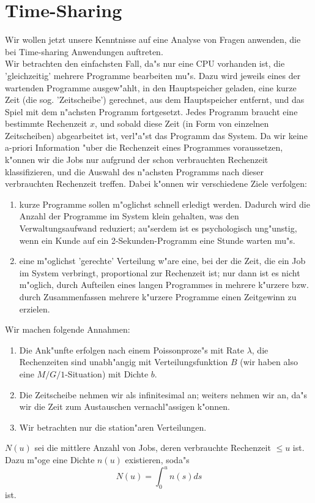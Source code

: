 \chapter{Time-Sharing}
Wir wollen jetzt unsere Kenntnisse auf eine Analyse von Fragen anwenden, die bei Time-sharing Anwendungen auftreten. \\
Wir betrachten den einfachsten Fall, da"s nur eine CPU vorhanden ist, die 'gleichzeitig' mehrere Programme bearbeiten mu"s.
Dazu wird jeweils eines der wartenden Programme ausgew"ahlt, in den Hauptspeicher geladen, eine kurze Zeit (die sog. 'Zeitscheibe') gerechnet,
aus dem
Hauptspeicher entfernt, und das Spiel mit dem n"achsten Programm fortgesetzt. Jedes Programm braucht eine bestimmte Rechenzeit $x$, und sobald
diese Zeit (in
Form von einzelnen Zeitscheiben) abgearbeitet ist, verl"a"st das Programm das System. Da wir keine a-priori Information "uber die Rechenzeit eines Programmes 
voraussetzen, k"onnen wir die Jobs nur aufgrund der schon verbrauchten Rechenzeit klassifizieren, und die Auswahl des n"achsten Programms nach dieser verbrauchten 
Rechenzeit treffen. Dabei k"onnen wir verschiedene Ziele verfolgen:
\begin{enumerate}
\begin{enumerate}
\item kurze Programme sollen m"oglichst schnell erledigt werden. Dadurch wird die Anzahl der Programme im System klein gehalten, was den Verwaltungsaufwand
reduziert; au"serdem ist es psychologisch ung"unstig, wenn ein Kunde auf ein 2-Sekunden-Programm eine Stunde warten mu"s. 
\item eine m"oglichst 'gerechte' Verteilung w"are eine, bei der die Zeit, die ein Job im System verbringt, proportional zur Rechenzeit ist; nur dann ist es nicht 
m"oglich, durch Aufteilen eines langen Programmes in mehrere k"urzere bzw. durch Zusammenfassen mehrere k"urzere Programme einen Zeitgewinn zu erzielen.
\end{enumerate} 
\end{enumerate}

Wir machen folgende Annahmen:
\begin{enumerate}
\item Die Ank"unfte erfolgen nach einem Poissonproze"s mit Rate $\lambda$, die Rechenzeiten sind unabh"angig mit Verteilungsfunktion $B$ (wir haben also eine
$M/G/1$-Situation) mit Dichte $b$.
\item Die Zeitscheibe nehmen wir als infinitesimal an; weiters nehmen wir an, da"s wir die Zeit zum Austauschen vernachl"assigen k"onnen.
\item Wir betrachten nur die station"aren Verteilungen.
\end{enumerate}
$N(u)$ sei die mittlere Anzahl von Jobs, deren verbrauchte Rechenzeit $\leq u$ ist. Dazu m"oge eine Dichte $n(u)$ existieren, soda"s
\[N(u)=\int_{0}^{u}n(s)ds  \]
ist. 

